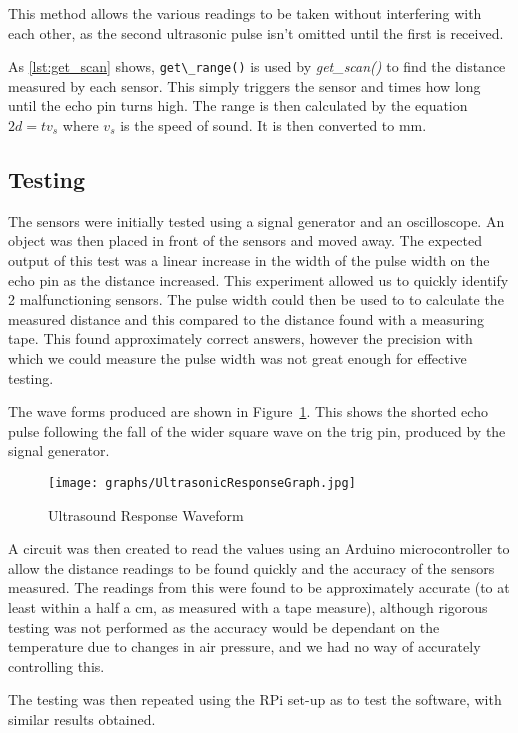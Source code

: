 This method allows the various readings to be taken without interfering with
each other, as the second ultrasonic pulse isn't omitted until the first is received.

As \ref{lst:get_scan} shows, \verb|get\_range()| is used by
\textit{get\_scan()} to find the distance measured by each sensor.
This simply triggers the sensor and times how long until the echo
pin turns high. The range is then calculated by the equation
$ 2d = tv_s$ where $v_s$ is the speed of sound. It is then converted
to mm.

\subsection{Testing}\label{elec/range/test}
The sensors were initially tested using a signal generator and an
oscilloscope. An object was then placed in front of the sensors
and moved away. The expected output of this test was a linear increase
in the width of the pulse width on the echo pin as the distance
increased. This experiment allowed us to quickly identify 2
malfunctioning sensors. The pulse width could then be used to to
calculate the measured distance and this compared to the distance
found with a measuring tape. This found approximately correct answers,
however the precision with which we could measure the pulse width was
not great enough for effective testing.

The wave forms produced are shown in Figure~\ref{UltrasoundWaveform}.
This shows the shorted echo pulse following the fall of the wider
square wave on the trig pin, produced by the signal generator.

\begin{figure}[!ht]
	\centering
	\texttt{[image: graphs/UltrasonicResponseGraph.jpg]}
	\caption{Ultrasound Response Waveform}\label{UltrasoundWaveform}

\end{figure}

A circuit was then created to read the values using an Arduino
microcontroller to allow the distance readings to be found quickly
and the accuracy of the sensors measured. The readings from this were
found to be approximately accurate (to at least within a half a cm,
as measured with a tape measure), although rigorous testing was not
performed as the accuracy would be dependant on the temperature due
to changes in air pressure, and we had no way of accurately controlling
this.

The testing was then repeated using the RPi set-up as to test the
software, with similar results obtained.

